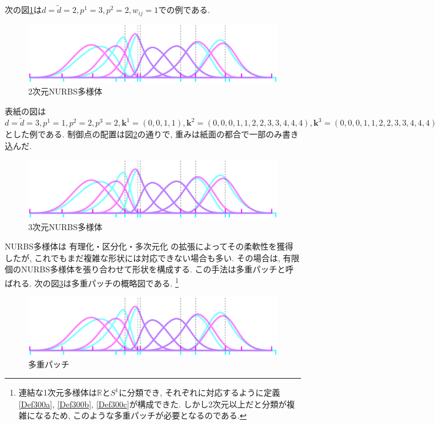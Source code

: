 \documentclass{jsarticle}
\newcommand\setR{\mathbb{R}}
\theoremstyle{definition}%
\begin{document}
次の図\ref{Fig501}は$d=\tilde{d}=2, p^1=3, p^2=2, w_{ij}=1$での例である.
\begin{figure}[H]
	\centering
    \includegraphics[page=4,clip,width=120mm]{figA.pdf}
    \caption{2次元NURBS多様体}
	\label{Fig501}
\end{figure}

\newpage
表紙の図は$d=\tilde{d}=3, p^1=1, p^2=2, p^3=2, \bm{k}^1=(0,0,1,1), \bm{k}^2=(0,0,0,1,1,2,2,3,3,4,4,4), \bm{k}^3=(0,0,0,1,1,2,2,3,3,4,4,4)$とした例である.
制御点の配置は図\ref{Fig502}の通りで, 重みは紙面の都合で一部のみ書き込んだ.
\begin{figure}[H]
	\centering
    \includegraphics[page=5,clip,width=130mm]{figA.pdf}
    \caption{3次元NURBS多様体}
	\label{Fig502}
\end{figure}
NURBS多様体は 有理化・区分化・多次元化 の拡張によってその柔軟性を獲得したが, これでもまだ複雑な形状には対応できない場合も多い.
その場合は, 有限個のNURBS多様体を張り合わせて形状を構成する.
この手法は多重パッチと呼ばれる.
次の図\ref{Fig503}は多重パッチの概略図である.%
\footnote{連結な1次元多様体は$\setR$と$S^1$に分類でき, それぞれに対応するように定義\ref{Def300a}, \ref{Def300b}, \ref{Def300c}が構成できた. しかし2次元以上だと分類が複雑になるため, このような多重パッチが必要となるのである.}
\begin{figure}[H]
	\centering
    \includegraphics[page=9,clip,width=140mm]{figA.pdf}
    \caption{多重パッチ}
	\label{Fig503}
\end{figure}

\newpage
\end{document}
